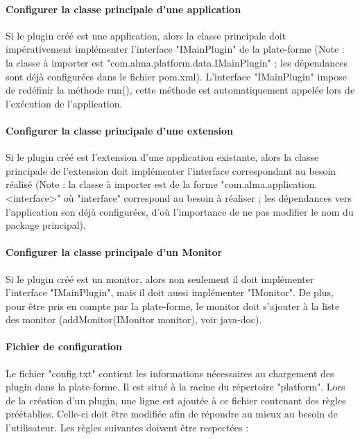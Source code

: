     \paragraph{Configurer la classe principale d'une application} 
    Si le plugin créé est une application, alors la classe principale doit impérativement implémenter l'interface "IMainPlugin" de la plate-forme (Note : la classe à importer est "com.alma.platform.data.IMainPlugin" ; les dépendances sont déjà configurées dans le fichier pom.xml). L'interface "IMainPlugin" impose de redéfinir la méthode run(), cette méthode est automatiquement appelée lors de l'exécution de l'application.
    
    \paragraph{Configurer la classe principale d'une extension} 
    Si le plugin créé est l'extension d'une application existante, alors la classe principale de l'extension doit implémenter l'interface correspondant au besoin réalisé (Note : la classe à importer est de la forme "com.alma.application. <interface>" où "interface" correspond au besoin à réaliser ; les dépendances vers l'application son déjà configurées, d'où l'importance de ne pas modifier le nom du package principal).
    
    \paragraph{Configurer la classe principale d'un Monitor} 
    Si le plugin créé est un monitor, alors non seulement il doit implémenter l'interface "IMainPlugin", mais il doit aussi implémenter "IMonitor". De plus, pour être pris en compte par la plate-forme, le monitor doit s'ajouter à la liste des monitor (addMonitor(IMonitor monitor), voir java-doc).
    
    \paragraph{Fichier de configuration} Le fichier "config.txt" contient les informations nécessaires au chargement des plugin dans la plate-forme. Il est situé à la racine du répertoire "platform". Lors de la création d'un plugin, une ligne est ajoutée à ce fichier contenant des règles préétablies. Celle-ci doit être modifiée afin de répondre au mieux au besoin de l'utilisateur. Les règles suivantes doivent être respectées :
    
